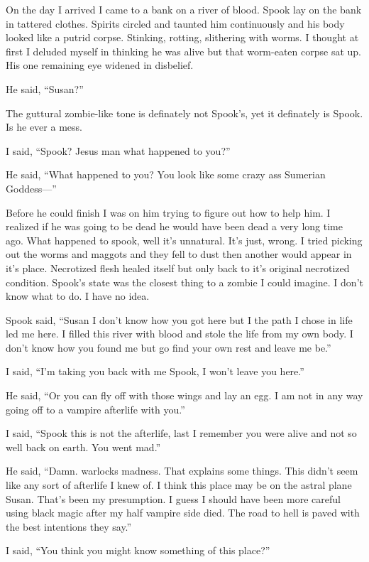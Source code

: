 On the day I arrived I came to a bank on a river of blood. Spook lay on the bank in tattered clothes. Spirits circled and taunted him continuously and his body looked like a putrid corpse. Stinking, rotting, slithering with worms. I thought at first I deluded myself in thinking he was alive but that worm-eaten corpse sat up. His one remaining eye widened in disbelief.
 
 He said, ``Susan?''
 
 The guttural zombie-like tone is definately not Spook's, yet it definately is Spook. Is he ever a mess.
 
 I said, ``Spook? Jesus man what happened to you?''

He said, ``What happened to you? You look like some crazy ass Sumerian Goddess---''

Before he could finish I was on him trying to figure out how to help him. I realized if he was going to be dead he would have been dead a very long time ago. What happened to spook, well it's unnatural. It's just, wrong. I tried picking out the worms and maggots and they fell to dust then another would appear in it's place. Necrotized flesh healed itself but only back to it's original necrotized condition. Spook's state was the closest thing to a zombie I could imagine. I don't know what to do. I have no idea.

Spook said, ``Susan I don't know how you got here but I the path I chose in life led me here. I filled this river with blood and stole the life from my own body. I don't know how you found me but go find your own rest and leave me be.''

I said, ``I'm taking you back with me Spook, I won't leave you here.''

He said, ``Or you can fly off with those wings and lay an egg. I am not in any way going off to a vampire afterlife with you.''

I said, ``Spook this is not the afterlife, last I remember you were alive and not so well back on earth. You went mad.''

He said, ``Damn. warlocks madness. That explains some things. This didn't seem like any sort of afterlife I knew of. I think this place may be on the astral plane Susan. That's been my presumption. I guess I should have been more careful using black magic after my half vampire side died. The road to hell is paved with the best intentions they say.''

I said, ``You think you might know something of this place?''

